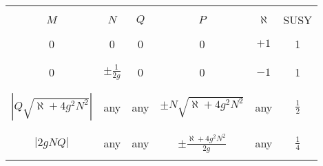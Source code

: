 \documentclass[12pt,a4paper]{article}
\begin{document}
\begin{table}
\footnotesize
\begin{center}
\begin{tabular}{||c|c|c|c|c|c||}
\hline\hline
& & & & & \\
$M$ & $N$ &  $Q$ & $P$ & $\aleph$ & SUSY \\ 
\hline\hline
& & & & & \\
0 & 0  &    0                &  0    & $+1$ & 1     \\ 
& & & & & \\
\hline
& & & & & \\
0    & $\pm {\displaystyle\frac{1}{2g}}$ &  0     &  0   &  $-1$ &   1   \\ 
& & & & & \\
\hline
& & & & & \\ 
$|Q\sqrt{\aleph +4g^{2}N^{2}}|$ & any &  any  & $\pm N\sqrt{\aleph +4g^{2}N^{2}}$  & any  & ${\displaystyle\frac{1}{2}}$\\
& & & & & \\
\hline
& & & & & \\
$|2gNQ|$ & any &  any  &  ${\displaystyle\pm\frac{\aleph+4g^{2}N^{2}}{2g}}$  & any  & ${\displaystyle\frac{1}{4}}$\\
& & & & & \\
\hline\hline
\end{tabular}
\end{center}


\end{table}
\end{document}

